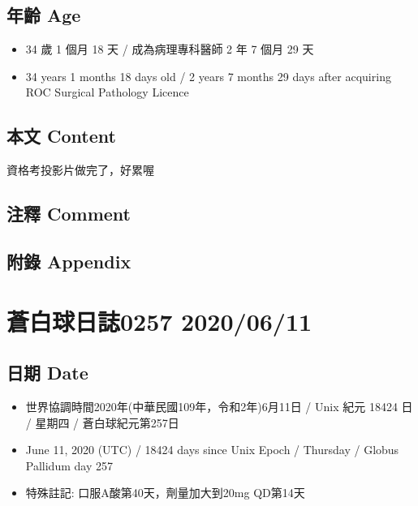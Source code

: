 \documentclass[a5paper, 11pt
]{book}
\providecommand{\tightlist}{%
  \setlength{\itemsep}{0pt}\setlength{\parskip}{0pt}}
\begin{document}
\hypertarget{ux5e74ux9f61-age-9}{%
\subsection{年齡 Age}\label{ux5e74ux9f61-age-9}}

\begin{itemize}
\tightlist
\item
  34 歲 1 個月 18 天 / 成為病理專科醫師 2 年 7 個月 29 天
\item
  34 years 1 months 18 days old / 2 years 7 months 29 days after
  acquiring ROC Surgical Pathology Licence
\end{itemize}

\hypertarget{ux672cux6587-content-9}{%
\subsection{本文 Content}\label{ux672cux6587-content-9}}

資格考投影片做完了，好累喔

\hypertarget{ux6ce8ux91cb-comment-9}{%
\subsection{注釋 Comment}\label{ux6ce8ux91cb-comment-9}}

\hypertarget{ux9644ux9304-appendix-9}{%
\subsection{附錄 Appendix}\label{ux9644ux9304-appendix-9}}

\hypertarget{ux84bcux767dux7403ux65e5ux8a8c0257-20200611}{%
\section{蒼白球日誌0257
2020/06/11}\label{ux84bcux767dux7403ux65e5ux8a8c0257-20200611}}

\hypertarget{ux65e5ux671f-date-10}{%
\subsection{日期 Date}\label{ux65e5ux671f-date-10}}

\begin{itemize}
\tightlist
\item
  世界協調時間2020年(中華民國109年，令和2年)6月11日 / Unix 紀元 18424 日
  / 星期四 / 蒼白球紀元第257日
\item
  June 11, 2020 (UTC) / 18424 days since Unix Epoch / Thursday / Globus
  Pallidum day 257
\item
  特殊註記: 口服A酸第40天，劑量加大到20mg QD第14天
\end{itemize}
\end{document}
